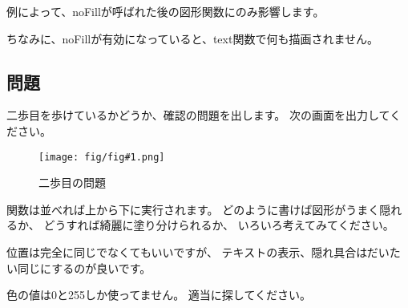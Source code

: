 \documentclass[12pt,titlepage]{ltjsarticle}
\newcommand{\fig}[2]{\begin{figure}[htbp]%
\centering\texttt{[image: fig/fig\#1.png]}%
\caption{#2}\end{figure}}
\begin{document}
例によって、noFillが呼ばれた後の図形関数にのみ影響します。

ちなみに、noFillが有効になっていると、text関数で何も描画されません。

\subsection{問題}
二歩目を歩けているかどうか、確認の問題を出します。
次の画面を出力してください。
\fig{2-2}{二歩目の問題}

関数は並べれば上から下に実行されます。
どのように書けば図形がうまく隠れるか、
どうすれば綺麗に塗り分けられるか、
いろいろ考えてみてください。

位置は完全に同じでなくてもいいですが、
テキストの表示、隠れ具合はだいたい同じにするのが良いです。

色の値は0と255しか使ってません。
適当に探してください。
\end{document}
